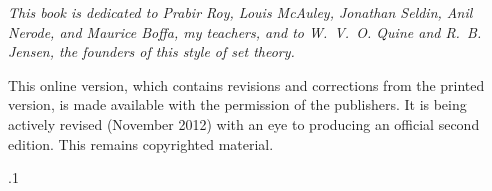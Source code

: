 \documentclass[twoside]{book}
\begin{document}
 
 
 
 
 
\pagestyle{headings}

\setcounter{page}{5}

\thispagestyle{plain}

\vspace*{3.8cm}
\begin{flushleft}\itshape
 This book is dedicated to Prabir Roy, Louis McAuley, Jonathan Seldin,
 Anil Nerode, and Maurice Boffa, my teachers, and to W.~V.~O. Quine and
 R.~B. Jensen, the founders of this style of set theory.

This online version, which contains revisions and corrections from the printed version, is made available with the permission of the publishers.
It is being actively revised (November 2012) with an eye to producing an official second edition.  This remains copyrighted material.
\end{flushleft}

\begingroup
\parskip.1\baselineskip
\tableofcontents
\endgroup





















































\setlength{\columnsep}{8mm}
\printindex
\end{document}
